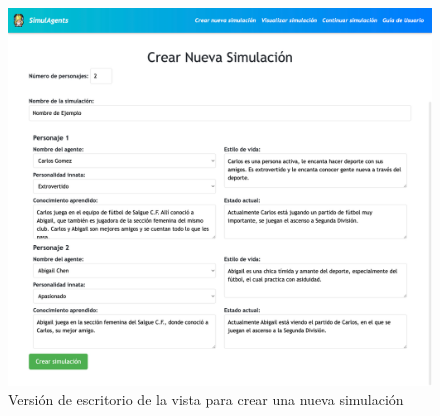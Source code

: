 \begin{figure}[H]
	\centering
	\includegraphics[width = 1\textwidth]{Imagenes/Vectorial/crearSimu.png}
	\caption{Versión de escritorio de la vista para crear una nueva simulación}
	\label{fig:vistaCrearSimulacion}
\end{figure}

